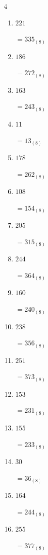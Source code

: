 \begin{multicols}{4}
\begin{enumerate}
        $=326_{(8)}$

  \item $221$

        $=335_{(8)}$

\columnbreak %

  \item $186$

        $=272_{(8)}$

  \item $163$

        $=243_{(8)}$

  \item $11$

        $=13_{(8)}$

  \item $178$

        $=262_{(8)}$

  \item $108$

        $=154_{(8)}$

  \item $205$

        $=315_{(8)}$

  \item $244$

        $=364_{(8)}$

  \item $160$

        $=240_{(8)}$

  \item $238$

        $=356_{(8)}$

  \item $251$

        $=373_{(8)}$

  \item $153$

        $=231_{(8)}$

  \item $155$

        $=233_{(8)}$

  \item $30$

        $=36_{(8)}$

  \item $164$

        $=244_{(8)}$

  \item $255$

        $=377_{(8)}$


\end{enumerate}
\end{multicols}

